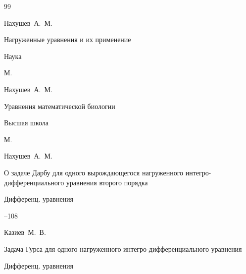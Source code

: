 \begin{thebibliography}{99}




\by Нахушев~А.~М.

\book Нагруженные уравнения и их применение


\publ Наука

\publaddr М.








\by Нахушев~А.~М.

\book Уравнения математической биологии


\publ Высшая школа

\publaddr М.








\by Нахушев~А.~М.

\paper О задаче Дарбу для одного вырождающегося нагруженного интегро-дифференциального уравнения второго порядка

\jour Дифференц. уравнения




--108







\by Казиев~М.~В.

\paper Задача Гурса для одного нагруженного интегро-дифференциального уравнения

\jour Дифференц. уравнения




\end{thebibliography}

